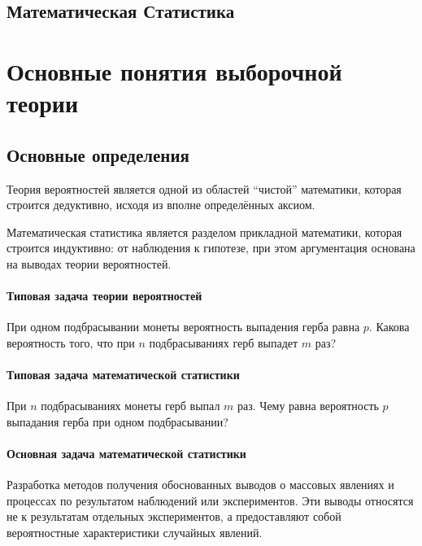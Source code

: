 
\begin{center}
	\section*{Математическая Статистика}
\end{center}



\section{Основные понятия выборочной теории}


\subsection{Основные определения}

Теория вероятностей является одной из областей ``чистой'' математики, которая строится дедуктивно, исходя из вполне определённых аксиом.

Математическая статистика является разделом прикладной математики, которая строится индуктивно: от наблюдения к гипотезе, при этом аргументация основана на выводах теории вероятностей.

\paragraph{Типовая задача теории вероятностей}
При одном подбрасывании монеты вероятность выпадения герба равна $p$. Какова вероятность того, что при $n$ подбрасываниях герб выпадет $m$ раз?

\paragraph{Типовая задача математической статистики}
При $n$ подбрасываниях монеты герб выпал $m$ раз. Чему равна вероятность $p$ выпадания герба при одном подбрасывании?

\paragraph{Основная задача математической статистики} Разработка методов получения обоснованных выводов о массовых явлениях и процессах по результатом наблюдений или экспериментов. Эти выводы относятся не к результатам отдельных экспериментов, а предоставляют собой вероятностные характеристики случайных явлений.

